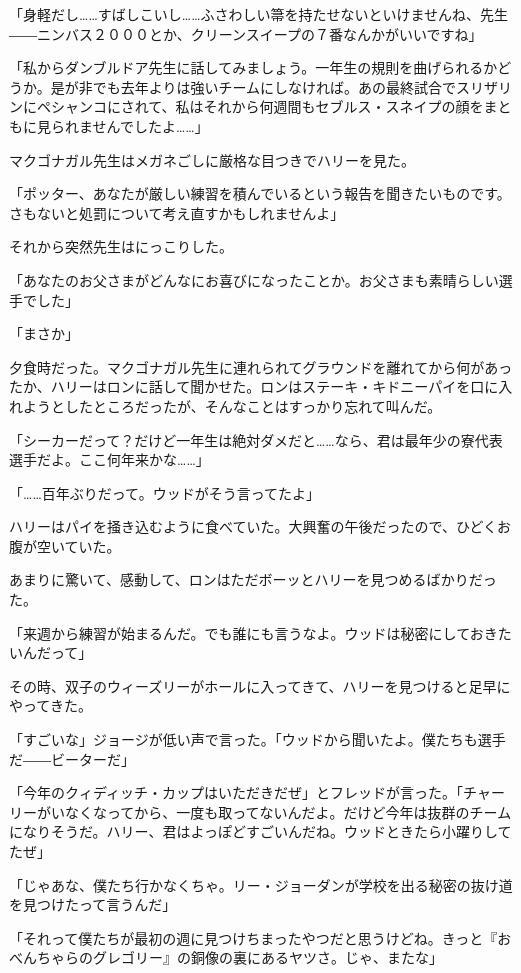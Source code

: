 \documentclass[10pt,a4paper]{article}
\begin{document}
\begin{CJK}{UTF8}{min}
「身軽だし……すばしこいし……ふさわしい箒を持たせないといけませんね、先生――ニンバス２０００とか、クリーンスイープの７番なんかがいいですね」

「私からダンブルドア先生に話してみましょう。一年生の規則を曲げられるかどうか。是が非でも去年よりは強いチームにしなければ。あの最終試合でスリザリンにペシャンコにされて、私はそれから何週間もセブルス・スネイプの顔をまともに見られませんでしたよ……」

マクゴナガル先生はメガネごしに厳格な目つきでハリーを見た。

「ポッター、あなたが厳しい練習を積んでいるという報告を聞きたいものです。さもないと処罰について考え直すかもしれませんよ」

それから突然先生はにっこりした。

「あなたのお父さまがどんなにお喜びになったことか。お父さまも素晴らしい選手でした」



「まさか」

夕食時だった。マクゴナガル先生に連れられてグラウンドを離れてから何があったか、ハリーはロンに話して聞かせた。ロンはステーキ・キドニーパイを口に入れようとしたところだったが、そんなことはすっかり忘れて叫んだ。

「シーカーだって？だけど一年生は絶対ダメだと……なら、君は最年少の寮代表選手だよ。ここ何年来かな……」

「……百年ぶりだって。ウッドがそう言ってたよ」

ハリーはパイを掻き込むように食べていた。大興奮の午後だったので、ひどくお腹が空いていた。

あまりに驚いて、感動して、ロンはただボーッとハリーを見つめるばかりだった。

「来週から練習が始まるんだ。でも誰にも言うなよ。ウッドは秘密にしておきたいんだって」

その時、双子のウィーズリーがホールに入ってきて、ハリーを見つけると足早にやってきた。

「すごいな」ジョージが低い声で言った。「ウッドから聞いたよ。僕たちも選手だ――ビーターだ」

「今年のクィディッチ・カップはいただきだぜ」とフレッドが言った。「チャーリーがいなくなってから、一度も取ってないんだよ。だけど今年は抜群のチームになりそうだ。ハリー、君はよっぽどすごいんだね。ウッドときたら小躍りしてたぜ」

「じゃあな、僕たち行かなくちゃ。リー・ジョーダンが学校を出る秘密の抜け道を見つけたって言うんだ」

「それって僕たちが最初の週に見つけちまったやつだと思うけどね。きっと『おべんちゃらのグレゴリー』の銅像の裏にあるヤツさ。じゃ、またな」


\end{CJK}
\end{document}
